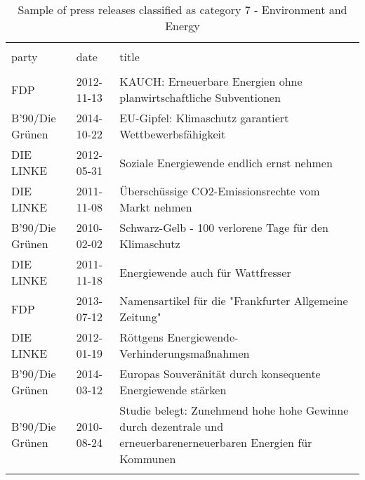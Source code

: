 
\begin{table}[!htbp] \centering 
  \caption{Sample of press releases classified as category 7 - Environment and Energy} 
  \label{tab:7-document-samples} 
\begin{tabularx}{\textwidth}{stX} 
\\[-1.8ex]\hline 
\hline \\[-1.8ex] 
party & date & title \\ 
\hline \\[-1.8ex] 
FDP & 2012-11-13 & KAUCH: Erneuerbare Energien ohne planwirtschaftliche Subventionen \\ 
B'90/Die Grünen & 2014-10-22 & EU-Gipfel: Klimaschutz garantiert Wettbewerbsfähigkeit \\ 
DIE LINKE & 2012-05-31 & Soziale Energiewende endlich ernst nehmen \\ 
DIE LINKE & 2011-11-08 & Überschüssige CO2-Emissionsrechte vom Markt nehmen \\ 
B'90/Die Grünen & 2010-02-02 & Schwarz-Gelb - 100 verlorene Tage für den Klimaschutz \\ 
DIE LINKE & 2011-11-18 & Energiewende auch für Wattfresser \\ 
FDP & 2013-07-12 & Namensartikel für die "Frankfurter Allgemeine Zeitung" \\ 
DIE LINKE & 2012-01-19 & Röttgens Energiewende-Verhinderungsmaßnahmen \\ 
B'90/Die Grünen & 2014-03-12 & Europas Souveränität durch konsequente Energiewende stärken \\ 
B'90/Die Grünen & 2010-08-24 & Studie belegt: Zunehmend hohe hohe Gewinne durch dezentrale und erneuerbarenerneuerbaren Energien für Kommunen \\ 
\hline \\[-1.8ex] 
\end{tabularx} 
\end{table} 
